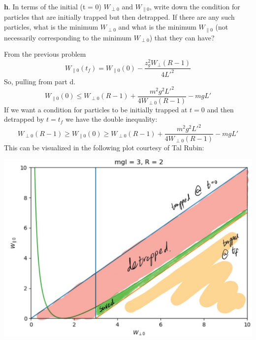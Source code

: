 \documentclass[12pt]{article}
\begin{document}
\noindent\textbf{h}.  In terms of the initial (t = 0) $W_{\perp 0}$ and $W_{\parallel 0}$, write down the condition for particles that are initially trapped but then detrapped. If there are any such particles, what
is the minimum $W_{\perp 0}$ and what is the minimum $W_{\parallel 0}$ (not necessarily corresponding
to the minimum $W_{\perp 0}$) that they can have?

From the previous problem
$$W_{\parallel0}(t_f)=W_{\parallel0}(0)-\frac{z_g^2W_{\perp}(R-1)}{4L'^2}$$
So, pulling from part d.
$$W_{\parallel0}(0)\leq W_{\perp0}(R-1)+\frac{m^2g^2L'^2}{4W_{\perp0}(R-1)}-mgL'$$
If we want a condition for particles to be initially trapped at $t=0$ and then detrapped by $t=t_f$ we have the double inequality:
$$W_{\perp0}(R-1)\geq W_{\parallel0}(0)\geq W_{\perp0}(R-1)+\frac{m^2g^2L'^2}{4W_{\perp0}(R-1)}-mgL'$$
This can be visualized in the following plot courtesy of Tal Rubin:

\hspace*{-2cm}\includegraphics[scale=0.6]{GravitationalTrapping.jpg}
\end{document}
